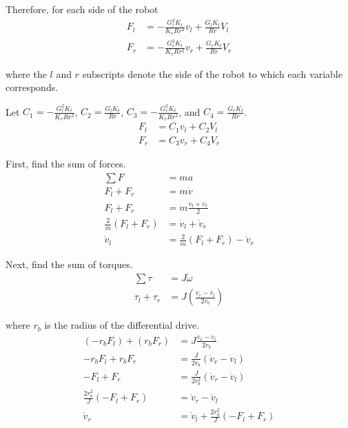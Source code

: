Therefore, for each side of the robot
\begin{align*}
  F_l &= -\frac{G_l^2 K_t}{K_v R r^2} v_l + \frac{G_l K_t}{Rr} V_l \\
  F_r &= -\frac{G_r^2 K_t}{K_v R r^2} v_r + \frac{G_r K_t}{Rr} V_r
\end{align*}

where the $l$ and $r$ subscripts denote the side of the robot to which each
variable corresponds.

Let $C_1 = -\frac{G_l^2 K_t}{K_v R r^2}$, $C_2 = \frac{G_l K_t}{Rr}$,
$C_3 = -\frac{G_r^2 K_t}{K_v R r^2}$, and $C_4 = \frac{G_r K_t}{Rr}$.
\begin{align}
  F_l &= C_1 v_l + C_2 V_l \\
  F_r &= C_3 v_r + C_4 V_r
\end{align}

First, find the sum of forces.
\begin{align}
  \sum F &= ma \nonumber \\
  F_l + F_r &= m \dot{v} \nonumber \\
  F_l + F_r &= m \frac{\dot{v}_l + \dot{v}_r}{2} \nonumber \\
  \frac{2}{m} (F_l + F_r) &= \dot{v}_l + \dot{v}_r \nonumber \\
  \dot{v}_l &= \frac{2}{m} (F_l + F_r) - \dot{v}_r \label{eq:diff_drive_dotv_l}
\end{align}

Next, find the sum of torques.
\begin{align*}
  \sum \tau &= J \dot{\omega} \\
  \tau_l + \tau_r &= J \left(\frac{\dot{v}_r - \dot{v}_l}{2 r_b}\right)
\end{align*}

where $r_b$ is the radius of the differential drive.
\begin{align*}
  (-r_b F_l) + (r_b F_r) &= J \frac{\dot{v}_r - \dot{v}_l}{2 r_b} \\
  -r_b F_l + r_b F_r &= \frac{J}{2 r_b} (\dot{v}_r - \dot{v}_l) \\
  -F_l + F_r &= \frac{J}{2 r_b^2} (\dot{v}_r - \dot{v}_l) \\
  \frac{2 r_b^2}{J} (-F_l + F_r) &= \dot{v}_r - \dot{v}_l \\
  \dot{v}_r &= \dot{v}_l + \frac{2 r_b^2}{J} (-F_l + F_r)
\end{align*}

